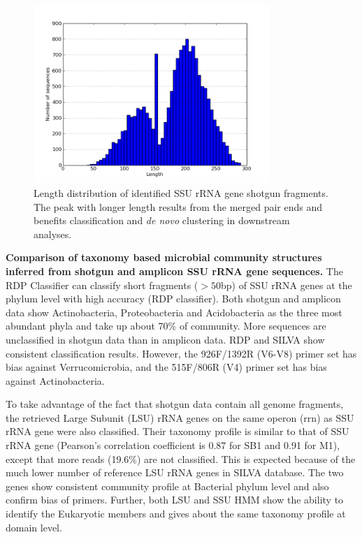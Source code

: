 \documentclass[12pt]{article}
\begin{document}
    \begin{figure}[tbph!]
    \centering
    \includegraphics[width=0.8\textwidth]{figs/read_length_dist.png}
    \caption[Length distribution of identified SSU rRNA gene shotgun fragments]{Length distribution of identified SSU rRNA gene shotgun fragments. The peak with longer length results from the merged pair ends and benefits classification and {\em de novo} clustering in downstream analyses.}
    \label{fig:read_length_dist}
    \end{figure}

  {\bf Comparison of taxonomy based microbial community structures inferred from shotgun and amplicon SSU rRNA gene sequences. }
The RDP Classifier can classify short fragments ($>50$bp) of SSU rRNA genes at the phylum level with high accuracy (RDP classifier). Both shotgun and amplicon data show Actinobacteria, Proteobacteria and Acidobacteria as the three most abundant phyla and take up about 70\% of community. More sequences are unclassified in shotgun data than in amplicon data. RDP and SILVA show consistent classification results. However, the 926F/1392R (V6-V8) primer set has bias against Verrucomicrobia, and the 515F/806R (V4) primer set has bias against Actinobacteria.

  To take advantage of the fact that shotgun data contain all genome fragments, the retrieved Large Subunit (LSU) rRNA genes on the same operon (rrn) as SSU rRNA gene were also classified. Their taxonomy profile is similar to that of SSU rRNA gene (Pearson’s correlation coefficient is 0.87 for SB1 and 0.91 for M1), except that more reads (19.6\%) are not classified. This is expected because of the much lower number of reference LSU rRNA genes in SILVA database. The two genes show consistent community profile at Bacterial phylum level and also confirm bias of primers. Further, both LSU and SSU HMM show the ability to identify the Eukaryotic members and gives about the same taxonomy profile at domain level.
\end{document}
